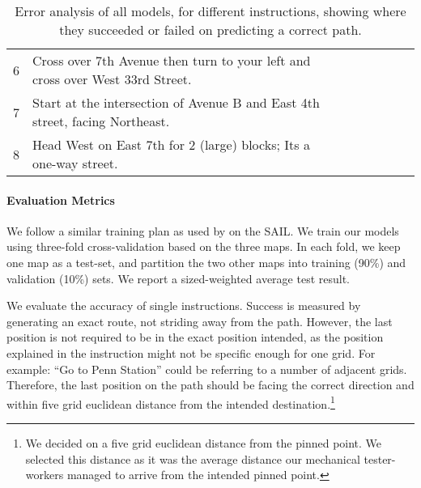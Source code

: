 \documentclass[11pt,a4paper]{article}
\newcommand{\cmark}{\ding{51}}%
\newcommand{\xmark}{\ding{55}}%
\begin{document}
\begin{table*}[t]
{\begin{tabular}{ll|l|l|l|l|l|l}
\multicolumn{1}{l|}{6} & Cross  over  7th  Avenue  then  turn  to  your  left  and  cross  over  West  33rd Street.                            & \xmark                 & \xmark            & \xmark             & \cmark              & \xmark                  & \multicolumn{1}{l|}{\cmark} \\ \cline{2-8} 
\multicolumn{1}{l|}{7} & Start at the intersection of Avenue B and East 4th street, facing Northeast.                                          & \xmark                 & \xmark            & \xmark             & \xmark              & \xmark                  & \multicolumn{1}{l|}{\xmark} \\ \cline{2-8} 
\multicolumn{1}{l|}{8} & Head West on East 7th for 2 (large) blocks; Its a one-way street.                                                     & \xmark                 & \xmark            & \xmark             & \xmark            & \xmark                  & \multicolumn{1}{l|}{\xmark} \\ \cline{2-8} 
\end{tabular}
}
\caption{Error analysis of all models, for different instructions, showing where they succeeded or failed on predicting a correct path.}
\label{tab:error_analysis}
\vspace{-0.1in}
\end{table*}




\paragraph{Evaluation Metrics}
 We follow a similar training plan as used by  \citet{chen2011learning} on the SAIL. We train our models using three-fold cross-validation based on the
three maps. In each fold, we keep one map as a test-set, and partition the two other maps into training (90\%) and validation (10\%) sets. We report a sized-weighted average test result. 

We evaluate the accuracy of single instructions. Success is measured by generating an exact route, not striding away from the path. However, the last position is not required to be in the exact position intended, as the position explained in the instruction might not be specific enough for one grid. For example: \enquote{Go to Penn Station} could be referring to a number of adjacent grids. Therefore, the last position on the path should be facing the correct direction and within five grid euclidean distance from the intended destination.\footnote{We decided on a five grid euclidean distance from the pinned point. We selected this distance as it was the average distance our mechanical tester-workers managed to arrive from the intended pinned point.} 
\end{document}
